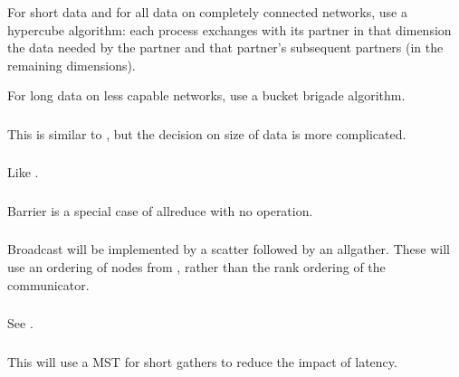 \documentclass{article}
\begin{document}
\subsubsection{}
For short data and for all data on completely connected networks, use a
hypercube algorithm: each process exchanges with its partner in that dimension
the data needed by the partner and that partner's subsequent partners (in the
remaining dimensions).

For long data on less capable networks, use a bucket brigade algorithm.

\subsubsection{}
This is similar to , but the decision on size of data is
more complicated. 

\subsubsection{}
Like .

\subsubsection{}
Barrier is a special case of allreduce with no operation.

\subsubsection{}
Broadcast will be implemented by a scatter followed by an allgather.  These
will use an ordering of nodes from , rather than
the rank ordering of the communicator.

\subsubsection{}
See .

\subsubsection{}
This will use a MST for short gathers to reduce the impact of latency.  

\subsubsection{}
\end{document}

